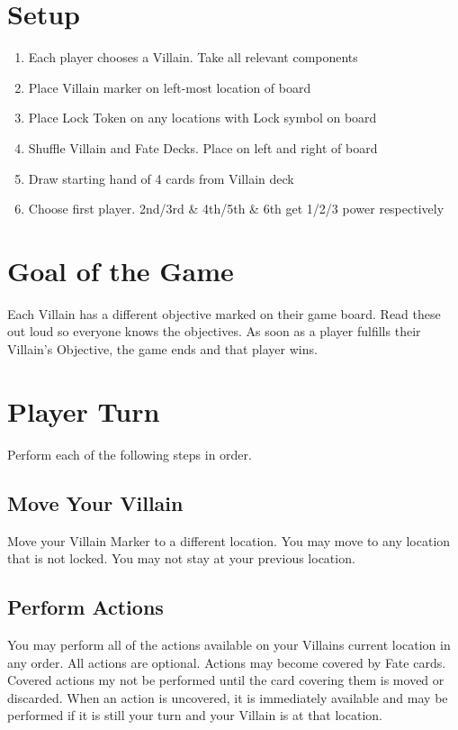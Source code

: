 \documentclass[12pt]{article}
\newenvironment{enumerateCustom}
{\begin{enumerate}
  \setlength{\itemsep}{1pt}
  \setlength{\parskip}{0pt}
  \setlength{\parsep}{0pt}}
{\end{enumerate}}
\begin{document}
\begin{mdframed}[style = customFrame]
\begin{multicols*}{2}

\section*{Setup}
\begin{enumerateCustom}
    \item Each player chooses a Villain. Take all relevant components
    \item Place Villain marker on left-most location of board
    \item Place Lock Token on any locations with Lock symbol on board
    \item Shuffle Villain and Fate Decks. Place on left and right of board
    \item Draw starting hand of 4 cards from Villain deck
    \item Choose first player. 2nd/3rd \& 4th/5th \& 6th get 1/2/3 power respectively
\end{enumerateCustom}

\section*{Goal of the Game}
Each Villain has a different objective marked on their game board. Read these out loud so everyone knows the objectives. As soon as a player fulfills their Villain's Objective, the game ends and that player wins.

\section*{Player Turn}
Perform each of the following steps in order.

\subsection*{Move Your Villain}
Move your Villain Marker to a different location. You may move to any location that is not locked. You may not stay at your previous location.

\subsection*{Perform Actions}
You may perform all of the actions available on your Villains current location in any order. All actions are optional. Actions may become covered by Fate cards. Covered actions my not be performed until the card covering them is moved or discarded. When an action is uncovered, it is immediately available and may be performed if it is still your turn and your Villain is at that location.


\end{multicols*}
\end{mdframed}
\end{document}
